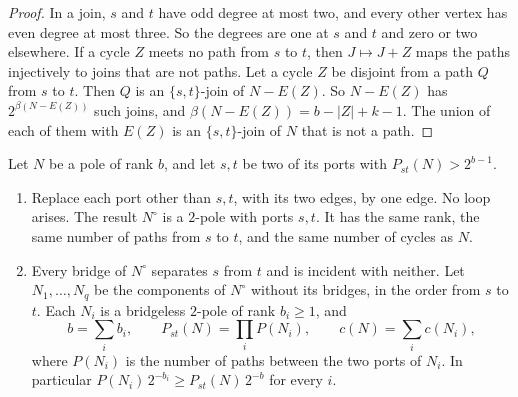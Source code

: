 \begin{proof}
In a join, $s$ and $t$ have odd degree at most two, and every other vertex has even degree at most
three. So the degrees are one at $s$ and $t$ and zero or two elsewhere. If a cycle $Z$ meets no
path from $s$ to $t$, then $J\mapsto J+Z$ maps the paths injectively to joins that are not paths.
Let a cycle $Z$ be disjoint from a path $Q$ from $s$ to $t$. Then $Q$ is an $\{s,t\}$-join of
$N-E(Z)$. So $N-E(Z)$ has $2^{\beta(N-E(Z))}$ such joins, and $\beta(N-E(Z))=b-|Z|+k-1$. The union
of each of them with $E(Z)$ is an $\{s,t\}$-join of $N$ that is not a path.
\end{proof}

\begin{lemma}[Reduction]\label{lem:reduction}
Let $N$ be a pole of rank $b$, and let $s,t$ be two of its ports with $P_{st}(N)>2^{b-1}$.
\begin{enumerate}
\item[\textup{(a)}] Replace each port other than $s,t$, with its two edges, by one edge. No loop
arises. The result $N^{\circ}$ is a $2$-pole with ports $s,t$. It has the same rank, the same number
of paths from $s$ to $t$, and the same number of cycles as $N$.
\item[\textup{(b)}] Every bridge of $N^{\circ}$ separates $s$ from $t$ and is incident with neither.
Let $N_1,\dots,N_q$ be the components of $N^{\circ}$ without its bridges, in the order from $s$ to
$t$. Each $N_i$ is a bridgeless $2$-pole of rank $b_i\ge1$, and
\[
  b=\sum_ib_i,\qquad P_{st}(N)=\prod_iP(N_i),\qquad c(N)=\sum_ic(N_i),
\]
where $P(N_i)$ is the number of paths between the two ports of $N_i$. In particular
$P(N_i)\,2^{-b_i}\ge P_{st}(N)\,2^{-b}$ for every $i$.
\end{enumerate}
\end{lemma}

